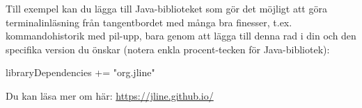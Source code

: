 Till exempel kan du lägga till Java-biblioteket  som gör det möjligt att göra terminalinläsning från tangentbordet med många bra finesser, t.ex. kommandohistorik med pil-upp, bara genom att lägga till denna rad i din  och den specifika version du önskar (notera enkla procent-tecken för Java-bibliotek):

\begin{Code}
libraryDependencies += "org.jline" %
\end{Code}
Du kan läsa mer om  här: \url{https://jline.github.io/}

